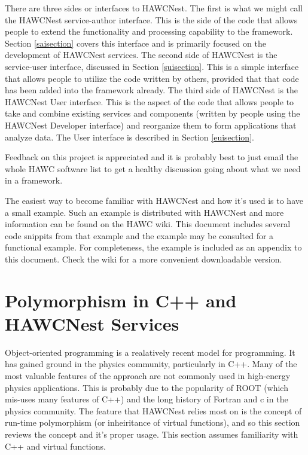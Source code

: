 \documentclass[12pt]{article}
\begin{document}
There are three sides or interfaces to HAWCNest. 
The first is what we might call the HAWCNest service-author interface. This is
the side of the code that allows people to extend the functionality and 
processing capability to the framework. Section \ref{saisection}
covers this interface and is primarily focused on the development of HAWCNest 
services. 
The second side of HAWCNest is the service-user interface, 
discussed in Section \ref{suisection}. This is a simple
interface
that allows people to utilize the code written by others, provided that that
code has been added into the framework already. 
The third side of HAWCNest is the
HAWCNest User interface. This is the aspect of the code that allows people to 
take and combine existing services and
components (written by people using the HAWCNest Developer interface) and 
reorganize them to form applications that
analyze data. The User interface is described in Section \ref{euisection}. 

Feedback on this project is appreciated and it is probably best to just email
the whole HAWC software list to get a healthy
discussion going about what we need in a framework.

The easiest way to become familiar with HAWCNest and how it's used is to 
have a small example.  Such an example is distributed with HAWCNest and more
information can be found on the HAWC wiki. This document includes several 
code snippits from that example and the example may be consulted for a 
functional example.  For completeness, the example is included as an appendix
to this document. Check the wiki for a more convenient downloadable 
version.

\section{Polymorphism in C++ and HAWCNest Services}

Object-oriented programming is a realatively recent model for programming.
It has gained ground in the physics community, particularly in C++.  Many
of the most valuable features of the approach are not commonly used in 
high-energy physics
applications.  This is probably due to the popularity of ROOT (which mis-uses
many features of C++) and the long history of Fortran and c in the physics 
community.  The feature that HAWCNest relies most on is the concept of 
run-time polymorphism (or inheiritance of virtual functions), 
and so this section reviews
the concept and it's proper usage.  This section assumes familiarity
with C++ and virtual functions.
\end{document}
